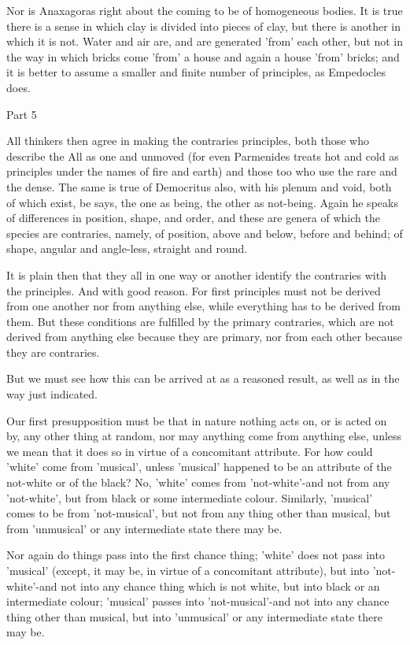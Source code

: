 Nor is Anaxagoras right about the coming to be of homogeneous bodies.
It is true there is a sense in which clay is divided into pieces of
clay, but there is another in which it is not. Water and air are,
and are generated 'from' each other, but not in the way in which bricks
come 'from' a house and again a house 'from' bricks; and it is better
to assume a smaller and finite number of principles, as Empedocles
does. 

Part 5

All thinkers then agree in making the contraries principles, both
those who describe the All as one and unmoved (for even Parmenides
treats hot and cold as principles under the names of fire and earth)
and those too who use the rare and the dense. The same is true of
Democritus also, with his plenum and void, both of which exist, be
says, the one as being, the other as not-being. Again he speaks of
differences in position, shape, and order, and these are genera of
which the species are contraries, namely, of position, above and below,
before and behind; of shape, angular and angle-less, straight and
round. 

It is plain then that they all in one way or another identify the
contraries with the principles. And with good reason. For first principles
must not be derived from one another nor from anything else, while
everything has to be derived from them. But these conditions are fulfilled
by the primary contraries, which are not derived from anything else
because they are primary, nor from each other because they are contraries.

But we must see how this can be arrived at as a reasoned result, as
well as in the way just indicated. 

Our first presupposition must be that in nature nothing acts on, or
is acted on by, any other thing at random, nor may anything come from
anything else, unless we mean that it does so in virtue of a concomitant
attribute. For how could 'white' come from 'musical', unless 'musical'
happened to be an attribute of the not-white or of the black? No,
'white' comes from 'not-white'-and not from any 'not-white', but from
black or some intermediate colour. Similarly, 'musical' comes to be
from 'not-musical', but not from any thing other than musical, but
from 'unmusical' or any intermediate state there may be.

Nor again do things pass into the first chance thing; 'white' does
not pass into 'musical' (except, it may be, in virtue of a concomitant
attribute), but into 'not-white'-and not into any chance thing which
is not white, but into black or an intermediate colour; 'musical'
passes into 'not-musical'-and not into any chance thing other than
musical, but into 'unmusical' or any intermediate state there may
be. 

